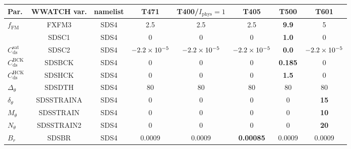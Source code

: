 \begin{landscape}
\begin{table} \begin{center} 
\begin{tabular}{|l|c|c|c|c|c|c|c|} \hline \hline
Par.                               &  WWATCH var.  & namelist  & T471        & T400/$I_{\mathrm{phys}}=1$& T405             & T500         & T601   \\
\hline
  $f_{\mathrm{FM}}$                &  FXFM3        & SDS4      & 2.5         & 2.5                       & 2.5              &\textbf{9.9}  & 5      \\
                                   & SDSC1         & SDS4      & 0           & 0                         & 0                &\textbf{1.0}  & 0      \\
  $C_{\mathrm{ds}}^{\mathrm{sat}}$ & SDSC2         & SDS4      &$-2.2\times 10^{-5}$&$-2.2\times 10^{-5}$              &$-2.2\times 10^{-5}$     &\textbf{0.0}  &$-2.2\times 10^{-5}$ \\
  $C_{\mathrm{ds}}^{\mathrm{BCK}}$ & SDSBCK        & SDS4      & 0           & 0                         & 0                &\textbf{0.185}& 0      \\
  $C_{\mathrm{ds}}^{\mathrm{HCK}}$ & SDSHCK        & SDS4      & 0           & 0                         & 0                &\textbf{1.5}  & 0      \\
  $\Delta_\theta$                  & SDSDTH        & SDS4      & 80          & 80                        & 80               & 80           &  80    \\
  $\delta_\theta$                  & SDSSTRAINA    & SDS4      & 0           & 0                         & 0                & 0            & \textbf{15}    \\
  $M_\theta$                       & SDSSTRAIN     & SDS4      & 0           & 0                         & 0                & 0            & \textbf{10}     \\
  $N_\theta$                       & SDSSTRAIN2    & SDS4      & 0           & 0                         & 0                & 0            & \textbf{20}     \\
  $B_r$                            & SDSBR         & SDS4      & 0.0009      & 0.0009                    &\textbf{0.00085}  & 0.0009       & 0.0009   \\

\end{tabular}
\end{center}
\end{table}
\end{landscape}
